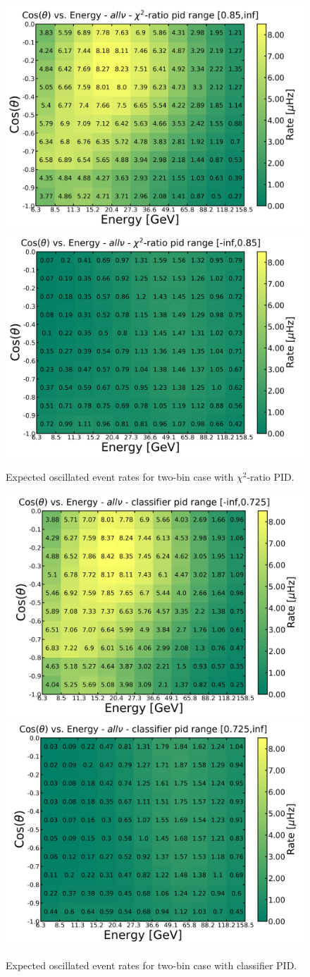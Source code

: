 \begin{appendices}
\begin{figure}[h]
    \centering
    \includegraphics[width=0.49\linewidth]{figures/santa_cut_085_allnu_1_oscillated_vmax.png}
    \includegraphics[width=0.49\linewidth]{figures/santa_cut_085_allnu_0_oscillated_vmax.png}
    \caption[Expected oscillated event rates for two-bin case with $\chi^2\textrm{-ratio}$ PID]{Expected oscillated event rates for two-bin case with $\chi^2\textrm{-ratio}$ PID.}
    \label{fig:oscillated_histrograms_santa_2bin}
\end{figure}

\begin{figure}[h]
    \centering
    \includegraphics[width=0.49\linewidth]{figures/two_bin_cut_0725_allnu_0_oscillated_vmax.png}
    \includegraphics[width=0.49\linewidth]{figures/two_bin_cut_0725_allnu_1_oscillated_vmax.png}
    \caption[Expected oscillated event rates for two-bin case with classifier PID]{Expected oscillated event rates for two-bin case with classifier PID.}
    \label{fig:oscillated_histrograms_classifier_2bin}
\end{figure}


\end{appendices}
